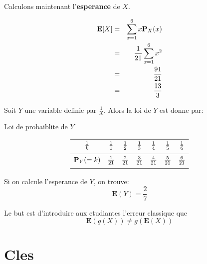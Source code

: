 \documentclass[a4paper]{tufte-handout}
\begin{document}
Calculons maintenant l'\textbf{esperance} de $X$.

\begin{eqnarray*}
  \mathbf{E}[X] &=& \sum_{x=1}^6 x\P_X(x)\\
                &=& \frac{1}{21} \sum_{x=1}^6 x^2\\
                &=& \frac{91}{21}\\
                &=& \frac{13}{3}
\end{eqnarray*}

Soit $Y$ une variable definie par $\frac{1}{X}$. Alors la loi de $Y$ est donne
par:

\begin{table}[htpb]
  \centering
  \caption{Loi de probaiblite de $Y$}
  \label{tab:label}
  $$
  \begin{array}{ccccccc}
    \toprule
    \frac{1}{k} & \frac{1}{1} & \frac{1}{2} & \frac{1}{3} & \frac{1}{4} &
    \frac{1}{5} & \frac{1}{6}\\[4pt]
    \midrule
    \P_Y(=k) & \frac{1}{21}& \frac{2}{21} & \frac{3}{21} & \frac{4}{21} &
    \frac{5}{21} & \frac{6}{21}\\[4pt]
    \bottomrule
  \end{array}
  $$
\end{table}

Si on calcule l'esperance de $Y$, on trouve:
\begin{equation}
  \mathbf{E}(Y) = \frac{2}{7}
\end{equation}

Le but est d'introduire aux etudiantes l'erreur classique que 
$$
\mathbf{E}\left(g\left(X\right)\right)  \neq g(\mathbf{E}\left(X\right))
$$

\section{Cles}
\end{document}
